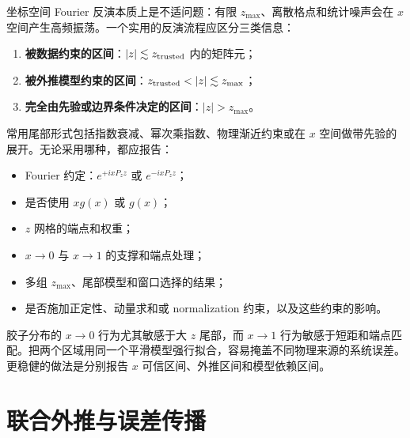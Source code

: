 \documentclass[UTF8,12pt,a4paper,twoside,openany]{ctexbook}
\begin{document}
坐标空间 Fourier 反演本质上是不适问题：有限 \(z_{\max}\)、离散格点和统计噪声会在 \(x\) 空间产生高频振荡。一个实用的反演流程应区分三类信息：
\begin{enumerate}
  \item \textbf{被数据约束的区间}：\(|z|\lesssim z_{\rm trusted}\) 内的矩阵元；
  \item \textbf{被外推模型约束的区间}：\(z_{\rm trusted}<|z|\lesssim z_{\max}\)；
  \item \textbf{完全由先验或边界条件决定的区间}：\(|z|>z_{\max}\)。
\end{enumerate}
常用尾部形式包括指数衰减、幂次乘指数、物理渐近约束或在 \(x\) 空间做带先验的展开。无论采用哪种，都应报告：
\begin{itemize}
  \item Fourier 约定：\(e^{+ixP_z z}\) 或 \(e^{-ixP_z z}\)；
  \item 是否使用 \(xg(x)\) 或 \(g(x)\)；
  \item \(z\) 网格的端点和权重；
  \item \(x\to0\) 与 \(x\to1\) 的支撑和端点处理；
  \item 多组 \(z_{\max}\)、尾部模型和窗口选择的结果；
  \item 是否施加正定性、动量求和或 normalization 约束，以及这些约束的影响。
\end{itemize}
胶子分布的 \(x\to0\) 行为尤其敏感于大 \(z\) 尾部，而 \(x\to1\) 行为敏感于短距和端点匹配。把两个区域用同一个平滑模型强行拟合，容易掩盖不同物理来源的系统误差。更稳健的做法是分别报告 \(x\) 可信区间、外推区间和模型依赖区间。

\section{联合外推与误差传播}
\end{document}
